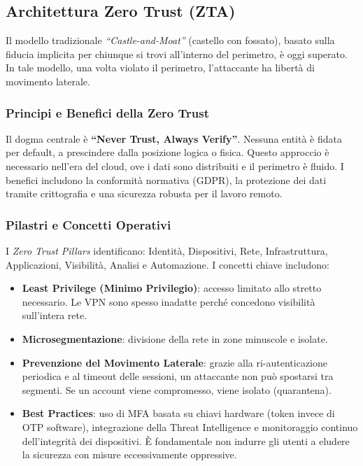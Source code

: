 \subsection{Architettura Zero Trust (ZTA)}

Il modello tradizionale \textit{``Castle-and-Moat''} (castello con fossato), basato sulla fiducia 
implicita per chiunque si trovi all'interno del perimetro, è oggi superato. In tale modello, una 
volta violato il perimetro, l'attaccante ha libertà di movimento laterale.

\subsubsection{Principi e Benefici della Zero Trust}

Il dogma centrale è \textbf{``Never Trust, Always Verify''}. Nessuna entità è fidata per default, 
a prescindere dalla posizione logica o fisica. Questo approccio è necessario nell'era del cloud, 
ove i dati sono distribuiti e il perimetro è fluido. I benefici includono la conformità normativa 
(GDPR), la protezione dei dati tramite crittografia e una sicurezza robusta per il lavoro remoto.

\subsubsection{Pilastri e Concetti Operativi}

I \textit{Zero Trust Pillars} identificano: Identità, Dispositivi, Rete, Infrastruttura, 
Applicazioni, Visibilità, Analisi e Automazione. I concetti chiave includono:

\begin{itemize}
    \item \textbf{Least Privilege (Minimo Privilegio)}: accesso limitato
    allo stretto necessario. Le VPN sono spesso inadatte perché
    concedono visibilità sull'intera rete.
    \item \textbf{Microsegmentazione}: divisione della rete in zone minuscole e isolate.
    \item \textbf{Prevenzione del Movimento Laterale}: grazie alla
    ri-autenticazione periodica e al timeout delle sessioni, un
    attaccante non può spostarsi tra segmenti. Se un account viene
    compromesso, viene isolato (quarantena).
    \item \textbf{Best Practices}: uso di MFA basata su chiavi hardware
    (token invece di OTP software), integrazione della Threat
    Intelligence e monitoraggio continuo dell'integrità dei dispositivi.
    È fondamentale non indurre gli utenti a eludere la sicurezza con
    misure eccessivamente oppressive.
\end{itemize}

